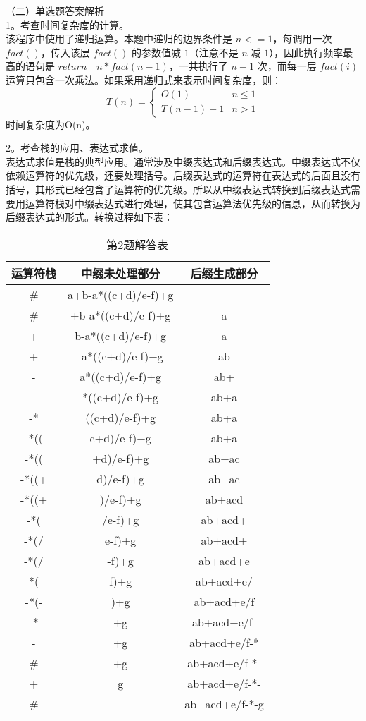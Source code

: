 （二）单选题答案解析\\
1。考查时间复杂度的计算。\\
该程序中使用了递归运算。本题中递归的边界条件是 $n<=1$，每调用一次 $fact()$，传入该层 $fact()$ 的参数值减 $1$（注意不是 $n$ 减 $1$），因此执行频率最高的语句是 $return \quad n*fact(n-1)$，一共执行了 $n-1$ 次，而每一层 $fact(i)$ 运算只包含一次乘法。如果采用递归式来表示时间复杂度，则： \\
\begin{equation}
T(n)= 
\begin{cases}
O(1) & n \le 1\\
T(n-1)+1 & n>1
\end{cases}
\end{equation}
时间复杂度为O(n)。

2。考查栈的应用、表达式求值。\\
表达式求值是栈的典型应用。通常涉及中缀表达式和后缀表达式。中缀表达式不仅依赖运算符的优先级，还要处理括号。后缀表达式的运算符在表达式的后面且没有括号，其形式已经包含了运算符的优先级。所以从中缀表达式转换到后缀表达式需要用运算符栈对中缀表达式进行处理，使其包含运算法优先级的信息，从而转换为后缀表达式的形式。转换过程如下表： \\
\begin{table}[ht]
\centering
\caption{第2题解答表}\label{CSN12_tab4}
\begin{tabular}{|c|c|c|}
\hline
运算符栈 & 中缀未处理部分 & 后缀生成部分 \\
\hline
\# &a+b-a*((c+d)/e-f)+g & \\
\hline
\# &+b-a*((c+d)/e-f)+g &a \\
\hline
+ &b-a*((c+d)/e-f)+g &a \\
\hline
+ &-a*((c+d)/e-f)+g &ab \\
\hline
- &a*((c+d)/e-f)+g &ab+ \\
\hline
- &*((c+d)/e-f)+g &ab+a \\
\hline
-* &((c+d)/e-f)+g &ab+a \\
\hline
-*(( &c+d)/e-f)+g &ab+a \\
\hline
-*(( &+d)/e-f)+g &ab+ac \\
\hline
-*((+ &d)/e-f)+g &ab+ac \\
\hline
-*((+ &)/e-f)+g &ab+acd \\
\hline
-*( &/e-f)+g &ab+acd+ \\
\hline
-*(/ &e-f)+g &ab+acd+ \\
\hline
-*(/ &-f)+g &ab+acd+e \\
\hline
-*(- &f)+g &ab+acd+e/ \\
\hline
-*(- &)+g &ab+acd+e/f \\
\hline
-* &+g &ab+acd+e/f- \\
\hline
- &+g &ab+acd+e/f-* \\
\hline
\# &+g &ab+acd+e/f-*- \\
\hline
+ &g &ab+acd+e/f-*- \\
\hline
\# &&ab+acd+e/f-*-g \\
\hline
\end{tabular}
\end{table}

